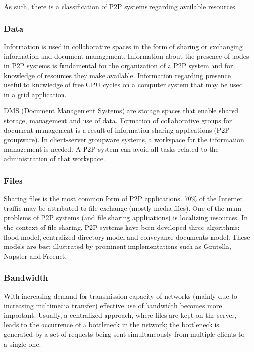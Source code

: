 As such, there is a classification of P2P systems regarding available resources.

\subsubsection{Data}

Information is used in collaborative spaces in the form of sharing or
exchanging information and document management. Information about the presence
of nodes in P2P systems is fundamental for the organization of a P2P system
and for knowledge of resources they make available. Information regarding
presence useful to knowledge of free CPU cycles on a computer system that may
be used in a grid application.

DMS (Document Management Systems) are storage spaces that enable shared
storage, management and use of data. Formation of collaborative groups for
document management is a result of information-sharing applications (P2P
groupware). In client-server groupware systems, a workspace for the
information management is needed. A P2P system can avoid all tasks related to
the administration of that workspace.

\subsubsection{Files}

Sharing files is the most common form of P2P applications. 70\% of the
Internet traffic may be attributed to file exchange (mostly media files). One
of the main problems of P2P systems (and file sharing applications) is
localizing resources. In the context of file sharing, P2P systems have been
developed three algorithms: flood model, centralized directory model and
conveyance documents model. These models are best illustrated by prominent
implementations such as Gnutella, Napster and Freenet.

\subsubsection{Bandwidth}

With increasing demand for transmission capacity of networks (mainly due to
increasing multimedia transfer) effective use of bandwidth becomes more
important. Usually, a centralized approach, where files are kept on the
server, leads to the occurrence of a bottleneck in the network; the
bottleneck is generated by a set of requests being sent simultaneously from
multiple clients to a single one.

